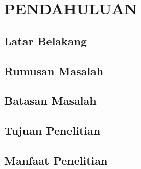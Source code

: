 \documentclass[ugmtesis]{ugmtesis}
\begin{document}
\begin{abstracteng}
  
\end{abstracteng}


\chapter{PENDAHULUAN}
\label{PENDAHULUAN}

	\section{Latar Belakang}
	\label{pendahuluan latar belakang}
	

	\section{Rumusan Masalah}
	\label{pendahuluan rumusan masalah}
	

	\section{Batasan Masalah}
	\label{pendahuluan batasan masalah}
	

	\section{Tujuan Penelitian}
	\label{pendahuluan tujuan penelitian}
	

	\section{Manfaat Penelitian}
	\label{pendahuluan manfaat penelitian}
	

\end{document}
